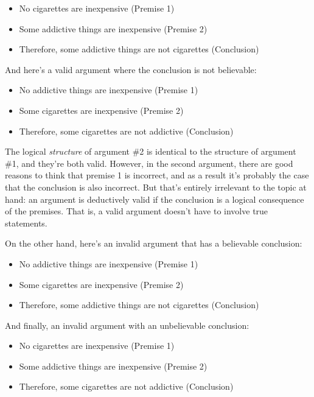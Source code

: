 \documentclass[]{book}
\providecommand{\tightlist}{%
  \setlength{\itemsep}{0pt}\setlength{\parskip}{0pt}}
\begin{document}
\begin{itemize}
\tightlist
\item
  No cigarettes are inexpensive (Premise 1)
\item
  Some addictive things are inexpensive (Premise 2)
\item
  Therefore, some addictive things are not cigarettes (Conclusion)
\end{itemize}

And here's a valid argument where the conclusion is not believable:

\begin{itemize}
\tightlist
\item
  No addictive things are inexpensive (Premise 1)
\item
  Some cigarettes are inexpensive (Premise 2)
\item
  Therefore, some cigarettes are not addictive (Conclusion)
\end{itemize}

The logical \emph{structure} of argument \#2 is identical to the structure of argument \#1, and they're both valid. However, in the second argument, there are good reasons to think that premise 1 is incorrect, and as a result it's probably the case that the conclusion is also incorrect. But that's entirely irrelevant to the topic at hand: an argument is deductively valid if the conclusion is a logical consequence of the premises. That is, a valid argument doesn't have to involve true statements.

On the other hand, here's an invalid argument that has a believable conclusion:

\begin{itemize}
\tightlist
\item
  No addictive things are inexpensive (Premise 1)
\item
  Some cigarettes are inexpensive (Premise 2)
\item
  Therefore, some addictive things are not cigarettes (Conclusion)
\end{itemize}

And finally, an invalid argument with an unbelievable conclusion:

\begin{itemize}
\tightlist
\item
  No cigarettes are inexpensive (Premise 1)
\item
  Some addictive things are inexpensive (Premise 2)
\item
  Therefore, some cigarettes are not addictive (Conclusion)
\end{itemize}
\end{document}
